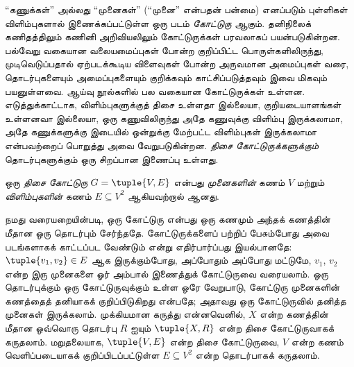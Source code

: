 \documentclass[../../../include/open-logic-section]{subfiles}
\begin{document}

“கணுக்கள்” அல்லது “முனைகள்” (“முனை” என்பதன் பன்மை) எனப்படும் புள்ளிகள்
விளிம்புகளால் இணைக்கப்பட்டுள்ள ஒரு படம் \emph{கோட்டுரு} ஆகும்.
தனிநிலைக் கணிதத்திலும் கணினி அறிவியலிலும் கோட்டுருக்கள் பரவலாகப்
பயன்படுகின்றன. பல்வேறு வகையான வலையமைப்புகள் போன்ற குறிப்பிட்ட
பொருள்களிலிருந்து, முடிவெடுப்பதால் ஏற்படக்கூடிய விளைவுகள் போன்ற
அருவமான அமைப்புகள் வரை, தொடர்புகளையும் அமைப்புகளையும் குறிக்கவும்
காட்சிப்படுத்தவும் இவை மிகவும் பயனுள்ளவை. ஆய்வு நூல்களில் பல வகையான
கோட்டுருக்கள் உள்ளன. எடுத்துக்காட்டாக, விளிம்புகளுக்குத் திசை உள்ளதா
இல்லையா, குறியடையாளங்கள் உள்ளனவா இல்லையா, ஒரு கணுவிலிருந்து அதே
கணுவுக்கு விளிம்பு இருக்கலாமா, அதே கணுக்களுக்கு இடையில் ஒன்றுக்கு
மேற்பட்ட விளிம்புகள் இருக்கலாமா என்பவற்றைப் பொறுத்து அவை வேறுபடுகின்றன.
\emph{திசை கோட்டுருக்களுக்கும்} தொடர்புகளுக்கும் ஒரு சிறப்பான இணைப்பு
உள்ளது.

\begin{defn}[திசை கோட்டுரு]
ஒரு \emph{திசை கோட்டுரு} $G = \tuple{V, E}$ என்பது
\emph{முனைகளின்} கணம் $V$ மற்றும் \emph{விளிம்புகளின்} கணம்
$E \subseteq V^2$ ஆகியவற்றால் ஆனது.
\end{defn}

\begin{explain}
நமது வரையறையின்படி, ஒரு கோட்டுரு என்பது ஒரு கணமும் அந்தக் கணத்தின் மீதான
ஒரு தொடர்பும் சேர்ந்ததே. கோட்டுருக்களைப் பற்றிப் பேசும்போது அவை
படங்களாகக் காட்டப்பட வேண்டும் என்று எதிர்பார்ப்பது இயல்பானதே:
$\tuple{v_1, v_2} \in E$ ஆக இருக்கும்போது, அப்போதும் அப்போது மட்டுமே,
$v_1$, $v_2$ என்ற இரு முனைகளை ஓர் அம்பால் இணைத்துக் கோட்டுருவை வரையலாம்.
ஒரு தொடர்புக்கும் ஒரு கோட்டுருவுக்கும் உள்ள ஒரே வேறுபாடு, கோட்டுரு
முனைகளின் கணத்தைத் தனியாகக் குறிப்பிடுகிறது என்பதே; அதாவது ஒரு
கோட்டுருவில் தனித்த முனைகள் இருக்கலாம். முக்கியமான கருத்து என்னவெனில்,
$X$ என்ற கணத்தின் மீதான ஒவ்வொரு தொடர்பு $R$ ஐயும்
$\tuple{X, R}$ என்ற திசை கோட்டுருவாகக் கருதலாம். மறுதலையாக,
$\tuple{V, E}$ என்ற திசை கோட்டுருவை, $V$ என்ற கணம் வெளிப்படையாகக்
குறிப்பிடப்பட்டுள்ள $E \subseteq V^2$ என்ற தொடர்பாகக் கருதலாம்.
\end{explain}
\end{document}
